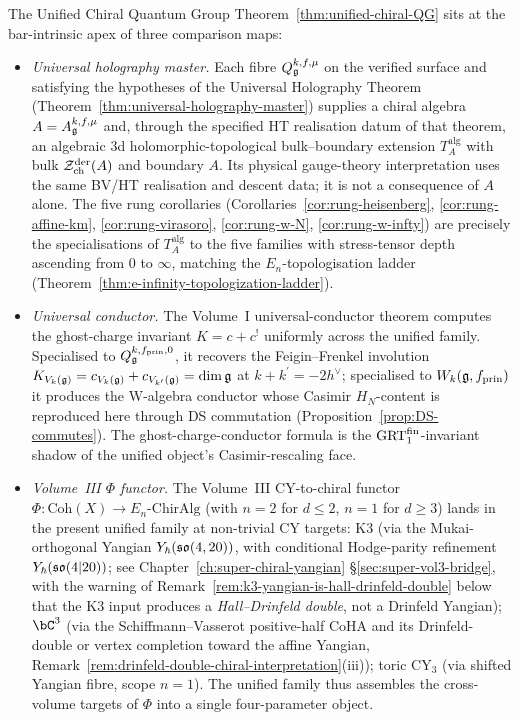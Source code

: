 \begin{remark}
\label{rem:ucqg-climax-anchors}
The Unified Chiral Quantum Group Theorem~\ref{thm:unified-chiral-QG}
sits at the bar-intrinsic apex of three comparison maps:
\begin{itemize}
\item[(a)] \emph{Universal holography master.} Each fibre
 $Q_{\mathfrak{g}}^{k,f,\mu}$ on the verified surface and satisfying the
 hypotheses of the Universal Holography Theorem
 (Theorem~\ref{thm:universal-holography-master}) supplies a chiral
 algebra $A = A_{\mathfrak{g}}^{k,f,\mu}$ and, through the specified HT
 realisation datum of that theorem, an algebraic \(3\)d
 holomorphic-topological bulk--boundary extension \(T_A^{\mathrm{alg}}\)
 with bulk $\mathcal{Z}^{\mathrm{der}}_{\mathrm{ch}}(A)$ and boundary $A$. Its
 physical gauge-theory interpretation uses the same BV/HT realisation
 and descent data; it is not a consequence of \(A\) alone. The five
 rung corollaries (Corollaries~\ref{cor:rung-heisenberg},
 \ref{cor:rung-affine-km}, \ref{cor:rung-virasoro},
 \ref{cor:rung-w-N}, \ref{cor:rung-w-infty}) are precisely the
 specialisations of \(T_A^{\mathrm{alg}}\) to the five families with stress-tensor
 depth ascending from $0$ to $\infty$, matching the
 $E_n$-topologisation ladder
 (Theorem~\ref{thm:e-infinity-topologization-ladder}).
\item[(b)] \emph{Universal conductor.} The Volume~I universal-conductor
 theorem computes the ghost-charge invariant $K = c + c^{!}$
 uniformly across the unified family. Specialised to
 $Q_{\mathfrak{g}}^{k,f_{\mathrm{prin}},0}$, it recovers the Feigin--Frenkel
 involution $K_{V_k(\mathfrak{g})} = c_{V_k(\mathfrak{g})} + c_{V_{k^{\prime}}(\mathfrak{g})} =
 \dim\mathfrak{g}$ at $k+k^{\prime} = -2h^{\vee}$; specialised to
 $W_k(\mathfrak{g}, f_{\mathrm{prin}})$ it produces the W-algebra conductor
 whose Casimir $H_N$-content is reproduced here through DS commutation
 (Proposition~\ref{prop:DS-commutes}). The ghost-charge-conductor
 formula is the $\mathrm{GRT}_1^{\mathrm{fin}}$-invariant shadow of the unified
 object's Casimir-rescaling face.
\item[(c)] \emph{Volume~III $\Phi$ functor.} The Volume~III
 CY-to-chiral functor $\Phi\colon \mathrm{Coh}(X) \to
 E_n\text{-}\mathrm{ChirAlg}$ (with $n=2$ for $d \le 2$, $n=1$ for
 $d \ge 3$) lands in the present unified family at non-trivial CY
 targets: K3 (via the Mukai-orthogonal Yangian
 $Y_{\hbar}(\mathfrak{so}(4,20))$, with conditional Hodge-parity refinement
 $Y_{\hbar}(\mathfrak{so}(4|20))$; see
 Chapter~\ref{ch:super-chiral-yangian} \S\ref{sec:super-vol3-bridge},
 with the warning of Remark~\ref{rem:k3-yangian-is-hall-drinfeld-double}
 below that the K3 input produces a \emph{Hall--Drinfeld double},
 not a Drinfeld Yangian);
 $\bC^{3}$ (via the Schiffmann--Vasserot positive-half CoHA and its
 Drinfeld-double or vertex completion toward the affine Yangian,
 Remark~\ref{rem:drinfeld-double-chiral-interpretation}(iii));
 toric CY${}_{3}$ (via shifted Yangian fibre, scope $n=1$). The
 unified family thus assembles the cross-volume targets of $\Phi$
 into a single four-parameter object.
\end{itemize}
\end{remark}

